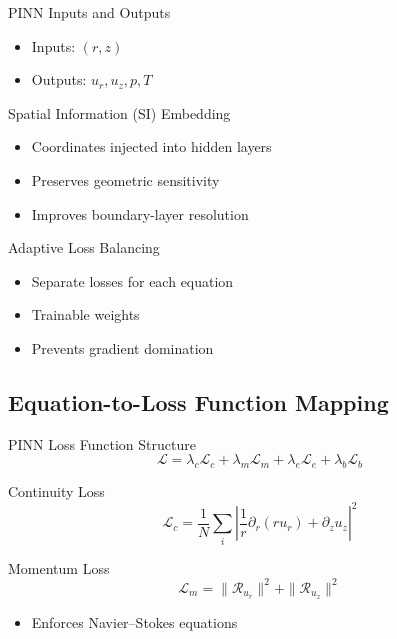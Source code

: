 \documentclass{beamer}
\begin{document}
\begin{frame}{PINN Inputs and Outputs}
\begin{itemize}
\item Inputs: $(r,z)$
\item Outputs: $u_r, u_z, p, T$
\end{itemize}
\end{frame}

\begin{frame}{Spatial Information (SI) Embedding}
\begin{itemize}
\item Coordinates injected into hidden layers
\item Preserves geometric sensitivity
\item Improves boundary-layer resolution
\end{itemize}
\end{frame}

\begin{frame}{Adaptive Loss Balancing}
\begin{itemize}
\item Separate losses for each equation
\item Trainable weights
\item Prevents gradient domination
\end{itemize}
\end{frame}

\subsection{Equation-to-Loss Function Mapping}

\begin{frame}{PINN Loss Function Structure}
\[
\mathcal{L}
= \lambda_c \mathcal{L}_c
+ \lambda_m \mathcal{L}_m
+ \lambda_e \mathcal{L}_e
+ \lambda_b \mathcal{L}_b
\]
\end{frame}

\begin{frame}{Continuity Loss}
\[
\mathcal{L}_c =
\frac{1}{N}\sum_i
\left|
\frac{1}{r}\partial_r(r u_r)
+ \partial_z u_z
\right|^2
\]
\end{frame}

\begin{frame}{Momentum Loss}
\[
\mathcal{L}_m =
\|\mathcal{R}_{u_r}\|^2 + \|\mathcal{R}_{u_z}\|^2
\]
\begin{itemize}
\item Enforces Navier--Stokes equations
\end{itemize}
\end{frame}
\end{document}
